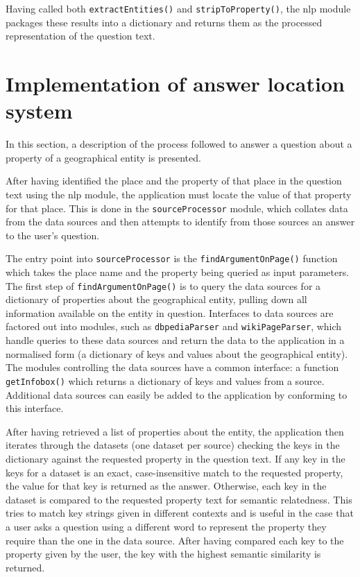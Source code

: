 \documentclass[authoryearcitations]{UoYCSproject}
\begin{document}
Having called both \texttt{extractEntities()} and \texttt{stripToProperty()}, the nlp module packages these results into a dictionary and returns them as the processed representation of the question text.

\section{Implementation of answer location system}
\label{sec:implementationOfAnswerLocationSys}
In this section, a description of the process followed to answer a question about a property of a geographical entity is presented. 

After having identified the place and the property of that place in the question text using the nlp module, the application must locate the value of that property for that place. This is done in the \texttt{sourceProcessor} module, which collates data from the data sources and then attempts to identify from those sources an answer to the user's question.

The entry point into \texttt{sourceProcessor} is the \texttt{findArgumentOnPage()} function which takes the place name and the property being queried as input parameters. The first step of \texttt{findArgumentOnPage()} is to query the data sources for a dictionary of properties about the geographical entity, pulling down all information available on the entity in question. Interfaces to data sources are factored out into modules, such as \texttt{dbpediaParser} and \texttt{wikiPageParser}, which handle queries to these data sources and return the data to the application in a normalised form (a dictionary of keys and values about the geographical entity). The modules controlling the data sources have a common interface: a function \texttt{getInfobox()} which returns a dictionary of keys and values from a source. Additional data sources can easily be added to the application by conforming to this interface.

After having retrieved a list of properties about the entity, the application then iterates through the datasets (one dataset per source) checking the keys in the dictionary against the requested property in the question text. If any key in the keys for a dataset is an exact, case-insensitive match to the requested property, the value for that key is returned as the answer. Otherwise, each key in the dataset is compared to the requested property text for semantic relatedness. This tries to match key strings given in different contexts and is useful in the case that a user asks a question using a different word to represent the property they require than the one in the data source. After having compared each key to the property given by the user, the key with the highest semantic similarity is returned. 
\end{document}
